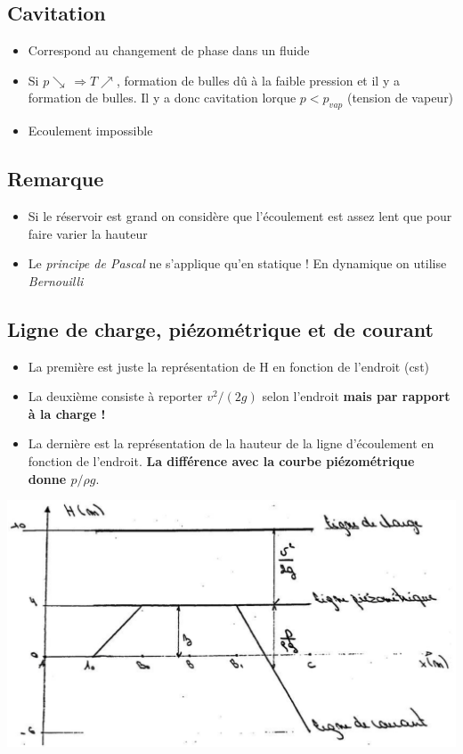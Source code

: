 \subsection*{Cavitation}
\begin{itemize}
	\item Correspond au changement de phase dans un fluide
	\item Si $p \searrow \, \Rightarrow T \nearrow$, formation de bulles dû à la faible pression et il y a formation de bulles. Il y a donc cavitation lorque $p < p_{vap}$ (tension de vapeur)
	\item Ecoulement impossible
\end{itemize}

\subsection*{Remarque}
\begin{itemize}
	\item Si le réservoir est grand on considère que l'écoulement est assez lent que pour faire varier la hauteur
	\item Le \textit{principe de Pascal} ne s'applique qu'en statique ! En dynamique on utilise \textit{Bernouilli}
\end{itemize}

\subsection*{Ligne de charge, piézométrique et de courant}
\begin{itemize}
\item La première est juste la représentation de H en fonction de l'endroit (cst)
\item La deuxième consiste à reporter $v^2/(2 g)$ selon l'endroit \textbf{mais par rapport à la charge !}
\item La dernière est la représentation de la hauteur de la ligne d'écoulement en fonction de l'endroit. \textbf{La différence avec la courbe piézométrique donne $p/\rho g$}.
\end{itemize}
\begin{center}
\includegraphics[scale=0.3]{tp6}
\end{center}